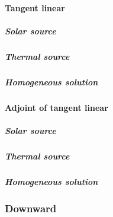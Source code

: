 %
\paragraph{Tangent linear}
\label{sec:source_function_integration-local_source_classical-upward-tangent_linear}

\subparagraph{Solar source}
\label{sec:source_function_integration-local_source_classical-upward-tangent_linear-solar_source}

\subparagraph{Thermal source}
\label{sec:source_function_integration-local_source_classical-upward-tangent_linear-thermal_source}

\subparagraph{Homogeneous solution}
\label{sec:source_function_integration-local_source_classical-upward-tangent_linear-homogeneous_solution}


%
\paragraph{Adjoint of tangent linear}
\label{sec:source_function_integration-local_source_classical-upward-adjoint_of_tangent_linear}

\subparagraph{Solar source}
\label{sec:source_function_integration-local_source_classical-upward-adjoint_of_tangent_linear-solar_source}

\subparagraph{Thermal source}
\label{sec:source_function_integration-local_source_classical-upward-adjoint_of_tangent_linear-thermal_source}

\subparagraph{Homogeneous solution}
\label{sec:source_function_integration-local_source_classical-upward-adjoint_of_tangent_linear-homogeneous_solution}


%
\subsubsection{Downward}
\label{sec:source_function_integration-local_source_classical-downward}


%
